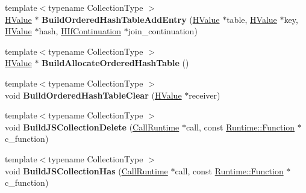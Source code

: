\begin{DoxyCompactItemize}
\item 
{\footnotesize template$<$typename Collection\+Type $>$ }\\\hyperlink{classv8_1_1internal_1_1_h_value}{H\+Value} $\ast$ {\bfseries Build\+Ordered\+Hash\+Table\+Add\+Entry} (\hyperlink{classv8_1_1internal_1_1_h_value}{H\+Value} $\ast$table, \hyperlink{classv8_1_1internal_1_1_h_value}{H\+Value} $\ast$key, \hyperlink{classv8_1_1internal_1_1_h_value}{H\+Value} $\ast$hash, \hyperlink{classv8_1_1internal_1_1_h_if_continuation}{H\+If\+Continuation} $\ast$join\+\_\+continuation)\hypertarget{classv8_1_1internal_1_1_h_optimized_graph_builder_af592b8dd753a98e98e6e0ae846611b78}{}\label{classv8_1_1internal_1_1_h_optimized_graph_builder_af592b8dd753a98e98e6e0ae846611b78}

\item 
{\footnotesize template$<$typename Collection\+Type $>$ }\\\hyperlink{classv8_1_1internal_1_1_h_value}{H\+Value} $\ast$ {\bfseries Build\+Allocate\+Ordered\+Hash\+Table} ()\hypertarget{classv8_1_1internal_1_1_h_optimized_graph_builder_a1c2bb4b99a76c41fa25e3cc44c3e4357}{}\label{classv8_1_1internal_1_1_h_optimized_graph_builder_a1c2bb4b99a76c41fa25e3cc44c3e4357}

\item 
{\footnotesize template$<$typename Collection\+Type $>$ }\\void {\bfseries Build\+Ordered\+Hash\+Table\+Clear} (\hyperlink{classv8_1_1internal_1_1_h_value}{H\+Value} $\ast$receiver)\hypertarget{classv8_1_1internal_1_1_h_optimized_graph_builder_a56de727c3c67f7332f90994f98e31cf1}{}\label{classv8_1_1internal_1_1_h_optimized_graph_builder_a56de727c3c67f7332f90994f98e31cf1}

\item 
{\footnotesize template$<$typename Collection\+Type $>$ }\\void {\bfseries Build\+J\+S\+Collection\+Delete} (\hyperlink{classv8_1_1internal_1_1_call_runtime}{Call\+Runtime} $\ast$call, const \hyperlink{structv8_1_1internal_1_1_runtime_1_1_function}{Runtime\+::\+Function} $\ast$c\+\_\+function)\hypertarget{classv8_1_1internal_1_1_h_optimized_graph_builder_aacab13119d43fe31f689ba3ba5e630aa}{}\label{classv8_1_1internal_1_1_h_optimized_graph_builder_aacab13119d43fe31f689ba3ba5e630aa}

\item 
{\footnotesize template$<$typename Collection\+Type $>$ }\\void {\bfseries Build\+J\+S\+Collection\+Has} (\hyperlink{classv8_1_1internal_1_1_call_runtime}{Call\+Runtime} $\ast$call, const \hyperlink{structv8_1_1internal_1_1_runtime_1_1_function}{Runtime\+::\+Function} $\ast$c\+\_\+function)\hypertarget{classv8_1_1internal_1_1_h_optimized_graph_builder_a886fa6d0a782d9ff716fb12fdb9c4622}{}\label{classv8_1_1internal_1_1_h_optimized_graph_builder_a886fa6d0a782d9ff716fb12fdb9c4622}


\end{DoxyCompactItemize}
